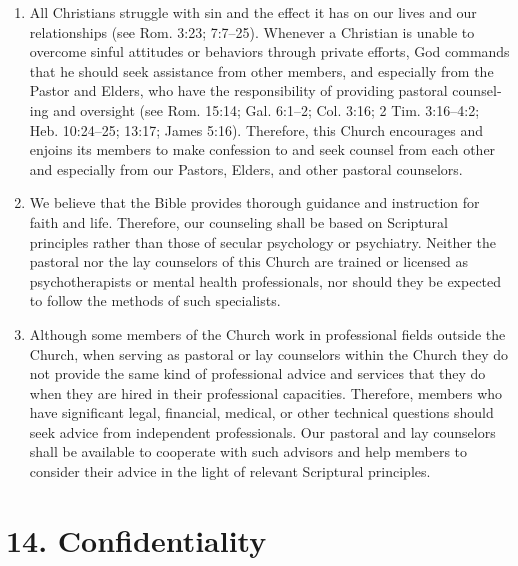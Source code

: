 \documentclass[
]{book}
\begin{document}
\begin{enumerate}
\def\labelenumi{\alph{enumi}.}
\item
  All Christians struggle with sin and the effect it has on our lives and our relationships (see Rom. 3:23; 7:7--25). Whenever a Christian is unable to overcome sinful attitudes or behaviors through private efforts, God commands that he should seek assistance from other members, and especially from the Pastor and Elders, who have the responsibility of providing pastoral coun­sel­ing and oversight (see Rom. 15:14; Gal. 6:1--2; Col. 3:16; 2 Tim. 3:16--4:2; Heb. 10:24--25; 13:17; James 5:16). Therefore, this Church encourages and enjoins its members to make confession to and seek counsel from each other and especially from our Pastors, Elders, and other pastoral counselors.
\item
  We believe that the Bible provides thorough guidance and instruction for faith and life. Therefore, our counseling shall be based on Scriptural principles rather than those of secular psychology or psychiatry. Neither the pastoral nor the lay counselors of this Church are trained or licensed as psycho­therapists or mental health professionals, nor should they be expected to follow the methods of such specialists.
\item
  Although some members of the Church work in professional fields outside the Church, when serving as pastoral or lay counselors within the Church they do not provide the same kind of professional advice and services that they do when they are hired in their professional capacities. Therefore, members who have significant legal, financial, medical, or other technical questions should seek advice from independent professionals. Our pastoral and lay counselors shall be available to cooperate with such advisors and help members to consider their advice in the light of relevant Scriptural principles.
\end{enumerate}

\hypertarget{confidentiality}{%
\section*{14. Confidentiality}\label{confidentiality}}
\end{document}
